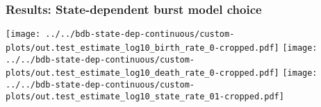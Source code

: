 \begin{frame}[t]
    \frametitle{Results: State-dependent burst model choice}

    \vspace{-3.5mm}
    \begin{center}

                \texttt{[image: ../../bdb-state-dep-continuous/custom-plots/out.test\_estimate\_log10\_birth\_rate\_0-cropped.pdf]}
                \hspace{3mm}
                \texttt{[image: ../../bdb-state-dep-continuous/custom-plots/out.test\_estimate\_log10\_death\_rate\_0-cropped.pdf]}
                \hspace{3mm}
                \texttt{[image: ../../bdb-state-dep-continuous/custom-plots/out.test\_estimate\_log10\_state\_rate\_01-cropped.pdf]}
    \end{center}

\end{frame}
